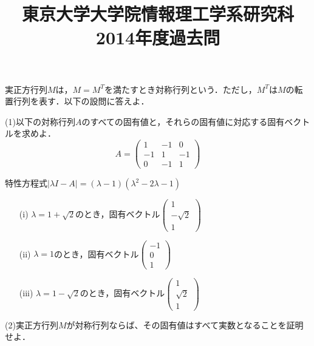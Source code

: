 \documentclass[a4j]{jarticle}
\title{東京大学大学院情報理工学系研究科2014年度過去問}
\author{}
\date{}
\let \ds \displaystyle
\begin{document}
\thispagestyle{empty}
\maketitle
\pagebreak

\section{}

\begin{screen}
 実正方行列$M$は，$M=M^T$を満たすとき対称行列という．ただし，$M^T$は$M$の転置行列を表す．以下の設問に答えよ．
\end{screen}

\begin{screen}
 (1)以下の対称行列$A$のすべての固有値と，それらの固有値に対応する固有ベクトルを求めよ．
 $$A=\begin{pmatrix}
    1 & -1 & 0 \\
    -1 & 1 & -1 \\
    0 & -1 & 1
   \end{pmatrix}$$
\end{screen}

特性方程式$|\lambda I - A|=(\lambda - 1)(\lambda^2 -2\lambda- 1)$

\begin{itemize}
 \item[(i)] $\lambda = 1 + \sqrt{2}$のとき，固有ベクトル$\ds \begin{pmatrix} 1 \\ -\sqrt{2} \\ 1\end{pmatrix}$
 \item[(ii)] $\lambda = 1 $のとき，固有ベクトル$\ds \begin{pmatrix} -1 \\ 0 \\ 1\end{pmatrix}$
 \item[(iii)] $\lambda = 1 - \sqrt{2}$のとき，固有ベクトル$\ds \begin{pmatrix} 1 \\ \sqrt{2} \\ 1\end{pmatrix}$
\end{itemize}

\begin{screen}
 (2)実正方行列$M$が対称行列ならば、その固有値はすべて実数となることを証明せよ．
\end{screen}
\end{document}
